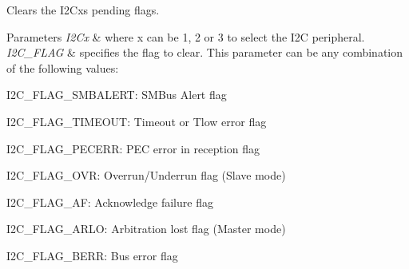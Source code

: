 Clears the I2\+Cx\textquotesingle{}s pending flags. 


\begin{DoxyParams}{Parameters}
{\em I2\+Cx} & where x can be 1, 2 or 3 to select the I2C peripheral. \\
\hline
{\em I2\+C\+\_\+\+F\+L\+AG} & specifies the flag to clear. This parameter can be any combination of the following values\+: \begin{DoxyItemize}
\item I2\+C\+\_\+\+F\+L\+A\+G\+\_\+\+S\+M\+B\+A\+L\+E\+RT\+: S\+M\+Bus Alert flag \item I2\+C\+\_\+\+F\+L\+A\+G\+\_\+\+T\+I\+M\+E\+O\+UT\+: Timeout or Tlow error flag \item I2\+C\+\_\+\+F\+L\+A\+G\+\_\+\+P\+E\+C\+E\+RR\+: P\+EC error in reception flag \item I2\+C\+\_\+\+F\+L\+A\+G\+\_\+\+O\+VR\+: Overrun/\+Underrun flag (Slave mode) \item I2\+C\+\_\+\+F\+L\+A\+G\+\_\+\+AF\+: Acknowledge failure flag \item I2\+C\+\_\+\+F\+L\+A\+G\+\_\+\+A\+R\+LO\+: Arbitration lost flag (Master mode) \item I2\+C\+\_\+\+F\+L\+A\+G\+\_\+\+B\+E\+RR\+: Bus error flag\end{DoxyItemize}
\\
\hline
\end{DoxyParams}
